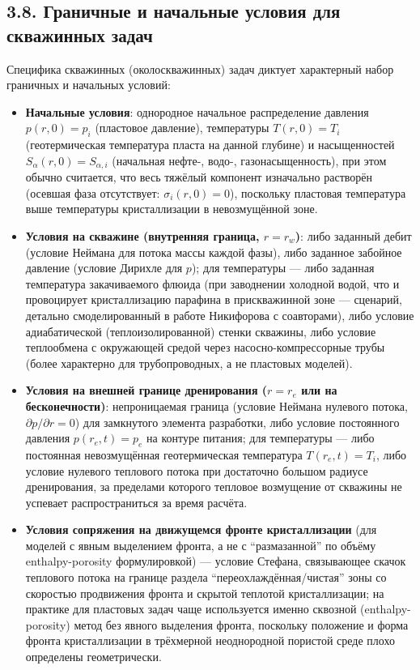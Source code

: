 \documentclass[11pt]{extarticle}
\providecommand{\tightlist}{\setlength{\itemsep}{0pt}\setlength{\parskip}{0pt}}
\begin{document}
\subsection{3.8. Граничные и начальные условия для скважинных задач}\label{ux433ux440ux430ux43dux438ux447ux43dux44bux435-ux438-ux43dux430ux447ux430ux43bux44cux43dux44bux435-ux443ux441ux43bux43eux432ux438ux44f-ux434ux43bux44f-ux441ux43aux432ux430ux436ux438ux43dux43dux44bux445-ux437ux430ux434ux430ux447}

Специфика скважинных (околоскважинных) задач диктует характерный набор граничных и начальных условий:

\begin{itemize}
\tightlist
\item
  \textbf{Начальные условия}: однородное начальное распределение давления \(p(r,0)=p_i\) (пластовое давление), температуры \(T(r,0)=T_i\) (геотермическая температура пласта на данной глубине) и насыщенностей \(S_\alpha(r,0)=S_{\alpha,i}\) (начальная нефте-, водо-, газонасыщенность), при этом обычно считается, что весь тяжёлый компонент изначально растворён (осевшая фаза отсутствует: \(\sigma_i(r,0)=0\)), поскольку пластовая температура выше температуры кристаллизации в невозмущённой зоне.
\item
  \textbf{Условия на скважине (внутренняя граница, \(r=r_w\))}: либо заданный дебит (условие Неймана для потока массы каждой фазы), либо заданное забойное давление (условие Дирихле для \(p\)); для температуры --- либо заданная температура закачиваемого флюида (при заводнении холодной водой, что и провоцирует кристаллизацию парафина в прискважинной зоне --- сценарий, детально смоделированный в работе Никифорова с соавторами), либо условие адиабатической (теплоизолированной) стенки скважины, либо условие теплообмена с окружающей средой через насосно-компрессорные трубы (более характерно для трубопроводных, а не пластовых моделей).
\item
  \textbf{Условия на внешней границе дренирования (\(r=r_e\) или на бесконечности)}: непроницаемая граница (условие Неймана нулевого потока, \(\partial p/\partial r=0\)) для замкнутого элемента разработки, либо условие постоянного давления \(p(r_e,t)=p_e\) на контуре питания; для температуры --- либо постоянная невозмущённая геотермическая температура \(T(r_e,t)=T_i\), либо условие нулевого теплового потока при достаточно большом радиусе дренирования, за пределами которого тепловое возмущение от скважины не успевает распространиться за время расчёта.
\item
  \textbf{Условия сопряжения на движущемся фронте кристаллизации} (для моделей с явным выделением фронта, а не с ``размазанной'' по объёму enthalpy-porosity формулировкой) --- условие Стефана, связывающее скачок теплового потока на границе раздела ``переохлаждённая/чистая'' зоны со скоростью продвижения фронта и скрытой теплотой кристаллизации; на практике для пластовых задач чаще используется именно сквозной (enthalpy-porosity) метод без явного выделения фронта, поскольку положение и форма фронта кристаллизации в трёхмерной неоднородной пористой среде плохо определены геометрически.

\end{itemize}
\end{document}
